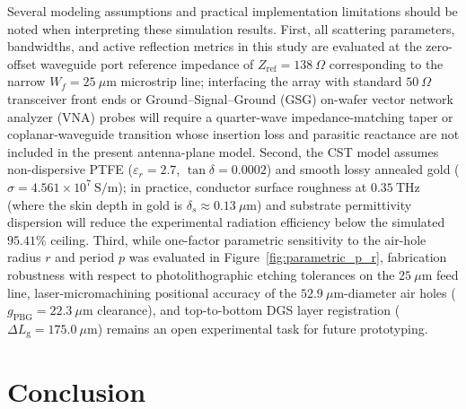\documentclass[referee,pdflatex,sn-mathphys-ay]{sn-jnl}
\begin{document}
Several modeling assumptions and practical implementation limitations should be noted when interpreting these simulation results. First, all scattering parameters, bandwidths, and active reflection metrics in this study are evaluated at the zero-offset waveguide port reference impedance of $Z_{\mathrm{ref}} = 138~\Omega$ corresponding to the narrow $W_f = 25~\mu\mathrm{m}$ microstrip line; interfacing the array with standard $50~\Omega$ transceiver front ends or Ground--Signal--Ground (GSG) on-wafer vector network analyzer (VNA) probes will require a quarter-wave impedance-matching taper or coplanar-waveguide transition whose insertion loss and parasitic reactance are not included in the present antenna-plane model. Second, the CST model assumes non-dispersive PTFE ($\varepsilon_r = 2.7$, $\tan\delta = 0.0002$) and smooth lossy annealed gold ($\sigma = 4.561 \times 10^{7}~\mathrm{S/m}$); in practice, conductor surface roughness at $0.35~\mathrm{THz}$ (where the skin depth in gold is $\delta_s \approx 0.13~\mu\mathrm{m}$) and substrate permittivity dispersion will reduce the experimental radiation efficiency below the simulated $95.41\%$ ceiling. Third, while one-factor parametric sensitivity to the air-hole radius $r$ and period $p$ was evaluated in Figure~\ref{fig:parametric_p_r}, fabrication robustness with respect to photolithographic etching tolerances on the $25~\mu\mathrm{m}$ feed line, laser-micromachining positional accuracy of the $52.9~\mu\mathrm{m}$-diameter air holes ($g_{\mathrm{PBG}} = 22.3~\mu\mathrm{m}$ clearance), and top-to-bottom DGS layer registration ($\Delta L_{\mathrm{g}} = 175.0~\mu\mathrm{m}$) remains an open experimental task for future prototyping.



\section{Conclusion}
\label{sec:conclusion}
\end{document}
